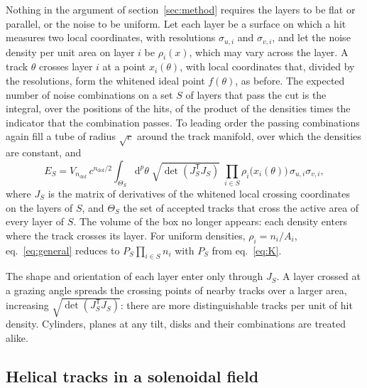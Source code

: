 \IfFileExists{jinst.cls}{\documentclass[a4paper,11pt]{jinst}}
\newcommand{\ndof}{n_\mathrm{dof}}
\newcommand{\dd}{\mathrm{d}}
\begin{document}
Nothing in the argument of section~\ref{sec:method} requires the layers to be flat or parallel,
or the noise to be uniform. Let each layer be a surface on which a hit measures two local
coordinates, with resolutions $\sigma_{u,i}$ and $\sigma_{v,i}$, and let the noise density per
unit area on layer $i$ be $\rho_i(x)$, which may vary across the layer. A track $\theta$ crosses
layer $i$ at a point $x_i(\theta)$, with local coordinates that, divided by the resolutions,
form the whitened ideal point $f(\theta)$, as before. The expected number of noise combinations
on a set $S$ of layers that pass the cut is the integral, over the positions of the hits, of
the product of the densities times the indicator that the combination passes. To leading order
the passing combinations again fill a tube of radius $\sqrt c$ around the track manifold, over
which the densities are constant, and
\begin{equation}
  E_S = V_{\ndof}\,c^{\ndof/2}\int_{\Theta_S}\dd^p\theta\;\sqrt{\det\!\left(J_S^\mathsf{T}J_S\right)}
        \;\prod_{i\in S}\rho_i\bigl(x_i(\theta)\bigr)\,\sigma_{u,i}\sigma_{v,i} ,
  \label{eq:general}
\end{equation}
where $J_S$ is the matrix of derivatives of the whitened local crossing coordinates on the
layers of $S$, and $\Theta_S$ the set of accepted tracks that cross the active area of every
layer of $S$. The volume of the box no longer appears: each density enters where the track
crosses its layer. For uniform densities, $\rho_i=n_i/A_i$, eq.~\eqref{eq:general} reduces to
$P_S\prod_{i\in S}n_i$ with $P_S$ from eq.~\eqref{eq:K}.

The shape and orientation of each layer enter only through $J_S$. A layer crossed at a grazing
angle spreads the crossing points of nearby tracks over a larger area, increasing
$\sqrt{\det(J_S^\mathsf{T}J_S)}$: there are more distinguishable tracks per unit of hit density.
Cylinders, planes at any tilt, disks and their combinations are treated alike.

\subsection{Helical tracks in a solenoidal field}\label{sec:field}
\end{document}
